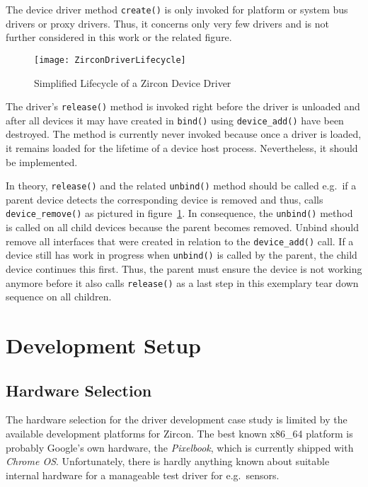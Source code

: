 The device driver method \texttt{create()} is only invoked for platform or system bus drivers or proxy drivers.
Thus, it concerns only very few drivers and is not further considered in this work or the related figure\cite{zircon-devicemodel}.
%
\begin{figure} [t]
    \centering
    \texttt{[image: ZirconDriverLifecycle]}
    \caption{Simplified Lifecycle of a Zircon Device Driver}
    \label{pic:zircon-lifecycle}
\end{figure}
%
The driver's \texttt{release()} method is invoked right before the driver is unloaded and after all devices it may have created in \texttt{bind()} using \texttt{device\_add()} have been destroyed.
The method is currently never invoked because once a driver is loaded, it remains loaded for the lifetime of a device host process.
Nevertheless, it should be implemented.

In theory, \texttt{release()} and the related \texttt{unbind()} method should be called e.g.\ if a parent device detects the corresponding device is removed and thus, calls \texttt{device\_remove()} as pictured in figure~\ref{pic:zircon-lifecycle}.
In consequence, the \texttt{unbind()} method is called on all child devices because the parent becomes removed.
Unbind should remove all interfaces that were created in relation to the \texttt{device\_add()} call.
If a device still has work in progress when \texttt{unbind()} is called by the parent, the child device continues this first.
Thus, the parent must ensure the device is not working anymore before it also calls \texttt{release()} as a last step in this exemplary tear down sequence on all children\cite{zircon-devicemodel}.


\section{Development Setup}
\subsection{Hardware Selection}
The hardware selection for the driver development case study is limited by the available development platforms for Zircon.
The best known x86\_64 platform is probably Google's own hardware, the \textit{Pixelbook}, which is currently shipped with \textit{Chrome OS}.
Unfortunately, there is hardly anything known about suitable internal hardware for a manageable test driver for e.g.\ sensors.

